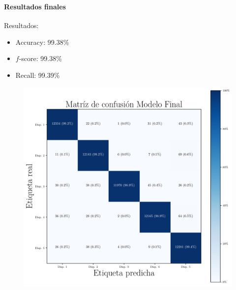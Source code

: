 \begin{frame}
\frametitle{\secname} %
\framesubtitle{Resultados finales} %
\rmfamily %
\color{black} %
\begin{minipage}{0.4\textwidth}
Resultados:
    \begin{itemize}
        \item Accuracy: 99.38\%
        \item $f$-score: 99.38\%
        \item Recall: 99.39\%
    \end{itemize}
\end{minipage}
\begin{minipage}{0.43\textwidth}
\begin{figure}
    \centering
    \includegraphics[width=1.6\textwidth]{../Python/plots/parallel/final_model_matrix.pdf}
\end{figure}
\end{minipage}
\end{frame}

